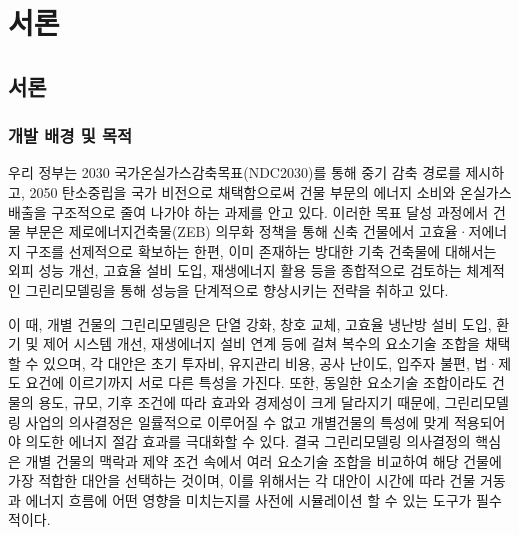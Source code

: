 \part{서론}
\label{part:introduction}


\chapter{서론}

\section{개발 배경 및 목적}

우리 정부는 2030 국가온실가스감축목표(NDC2030)를 통해 중기 감축 경로를 제시하고, 2050 탄소중립을 국가 비전으로 채택함으로써 건물 부문의 에너지 소비와 온실가스 배출을 구조적으로 줄여 나가야 하는 과제를 안고 있다\cite{korea_ndc_2050cnc_website}\cite{korea_ndc_enhanced_2021}.
이러한 목표 달성 과정에서 건물 부문은 제로에너지건축물(ZEB) 의무화 정책을 통해 신축 건물에서 고효율·저에너지 구조를 선제적으로 확보하는 한편, 이미 존재하는 방대한 기축 건축물에 대해서는 외피 성능 개선, 고효율 설비 도입, 재생에너지 활용 등을 종합적으로 검토하는 체계적인 그린리모델링을 통해 성능을 단계적으로 향상시키는 전략을 취하고 있다.

이 때, 개별 건물의 그린리모델링은 단열 강화, 창호 교체, 고효율 냉난방 설비 도입, 환기 및 제어 시스템 개선, 재생에너지 설비 연계 등에 걸쳐 복수의 요소기술 조합을 채택할 수 있으며, 각 대안은 초기 투자비, 유지관리 비용, 공사 난이도, 입주자 불편, 법·제도 요건에 이르기까지 서로 다른 특성을 가진다. 또한, 동일한 요소기술 조합이라도 건물의 용도, 규모, 기후 조건에 따라 효과와 경제성이 크게 달라지기 때문에\cite{shen2019feasibility}, 그린리모델링 사업의 의사결정은 일률적으로 이루어질 수 없고 개별건물의 특성에 맞게 적용되어야 의도한 에너지 절감 효과를 극대화할 수 있다.
결국 그린리모델링 의사결정의 핵심은 개별 건물의 맥락과 제약 조건 속에서 여러 요소기술 조합을 비교하여 해당 건물에 가장 적합한 대안을 선택하는 것이며, 이를 위해서는 각 대안이 시간에 따라 건물 거동과 에너지 흐름에 어떤 영향을 미치는지를 사전에 시뮬레이션 할 수 있는 도구가 필수적이다\cite{chen2017automatic}\cite{mostafazadeh2023energy}.

